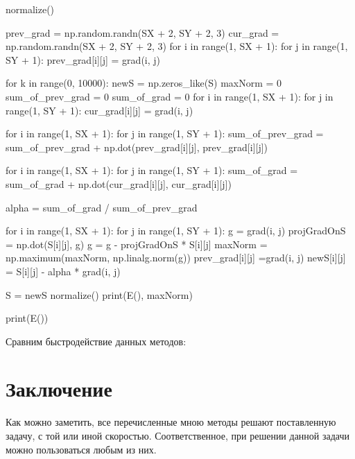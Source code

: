 \documentclass[ 12pt,x11names]{article}
\begin{document}
\begin{python}
normalize()

prev_grad =  np.random.randn(SX + 2, SY + 2, 3)
cur_grad = np.random.randn(SX + 2, SY + 2, 3)
for i in range(1, SX + 1):
    for j in range(1, SY + 1):
        prev_grad[i][j] = grad(i, j)

for k in range(0, 10000):
    newS = np.zeros_like(S)
    maxNorm = 0
    sum_of_prev_grad = 0
    sum_of_grad  =  0
    for i in range(1, SX + 1):
        for j in range(1, SY + 1):
            cur_grad[i][j] = grad(i,  j)

    for i in range(1, SX + 1):
        for j in range(1, SY + 1):
            sum_of_prev_grad = sum_of_prev_grad + np.dot(prev_grad[i][j], prev_grad[i][j])

    for i in range(1, SX + 1):
        for j in range(1, SY + 1):
            sum_of_grad = sum_of_grad + np.dot(cur_grad[i][j], cur_grad[i][j])

    alpha = sum_of_grad / sum_of_prev_grad

    for i in range(1, SX + 1):
        for j in range(1, SY + 1):
            g = grad(i,  j)
            projGradOnS = np.dot(S[i][j], g)
            g = g - projGradOnS * S[i][j]
            maxNorm = np.maximum(maxNorm, np.linalg.norm(g))
            prev_grad[i][j] =grad(i, j)
            newS[i][j] = S[i][j] - alpha * grad(i, j)

    S = newS
    normalize()
    print(E(), maxNorm)

print(E())

 \end{python}

 Сравним быстродействие данных методов:
    \section{Заключение}
    Как можно заметить, все перечисленные мною методы решают поставленную задачу, с той или иной скоростью. Соответственное, при решении данной задачи можно пользоваться любым из них.
    
\end{document}
